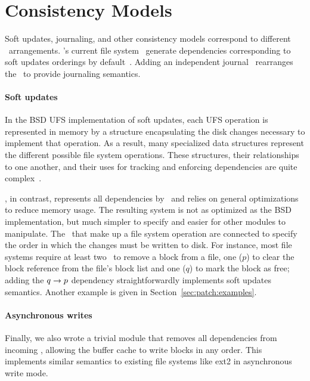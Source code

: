 \section{Consistency Models}
\label{sec:using}

Soft updates, journaling, and other consistency models
correspond to different \patch\ arrangements.
%
\Kudos's current file system \modules\ generate dependencies corresponding
to soft updates orderings by default~\cite{ganger00soft}.
%
Adding an independent journal \module\ rearranges the \patches\ to provide
journaling semantics.

\paragraph{Soft updates}
\label{sec:using:softupdate}

In the BSD UFS implementation of soft updates, each UFS operation is
represented in memory by a structure encapsulating the disk changes
necessary to implement that operation. As a result, many
specialized data structures represent the different possible file system
operations. These structures, their relationships to one another, and their uses
for tracking and enforcing dependencies are quite
complex~\cite{mckusick99soft}.

\Kudos, in contrast, represents all dependencies by \patches\ and relies on
general optimizations to reduce memory usage.
%
The resulting system is not as optimized as the BSD implementation, but
much simpler to specify and easier for other modules to manipulate.
%
The \patches\ that make up a file system operation are connected to specify
the order in which the changes must be written to disk.
%
For instance, most file systems require at least two \patches\ to remove
a block from a file, one ($p$) to clear the block reference from the file's
block list and one ($q$) to mark the block as free; adding the $q \rightarrow
p$ dependency straightforwardly implements soft updates semantics.
%
Another example is given in Section~\ref{sec:patch:examples}.



\paragraph{Asynchronous writes}
\label{sec:modules:unlink}

Finally, we also wrote a trivial module that removes all dependencies from
incoming \patches, allowing the buffer cache to write blocks in any order.
%
This implements similar semantics to existing file systems like ext2 in
asynchronous write mode.
